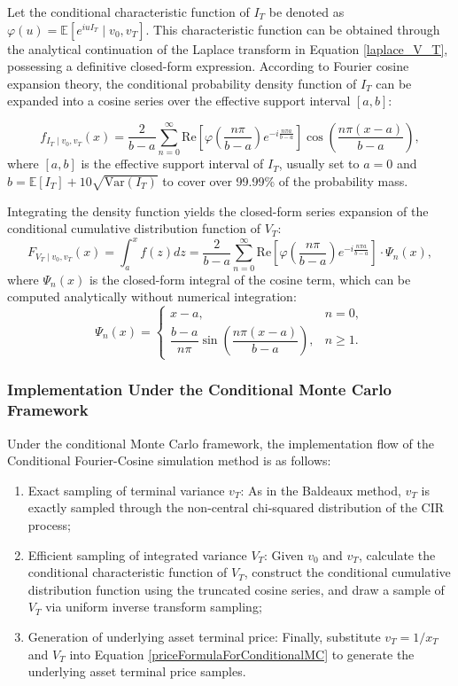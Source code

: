 Let the conditional characteristic function of $I_T$ be denoted as $\varphi(u) = \mathbb{E}\left[ e^{iuI_T} \mid v_0, v_T \right]$. This characteristic function can be obtained through the analytical continuation of the Laplace transform in Equation \eqref{laplace_V_T}, possessing a definitive closed-form expression. According to Fourier cosine expansion theory, the conditional probability density function of $I_T$ can be expanded into a cosine series over the effective support interval $[a,b]$:

\begin{equation}
  f_{I_T \mid v_0, v_T}(x) = \frac{2}{b-a} \sum_{n=0}^\infty \text{Re}\left[ \varphi\left( \frac{n\pi}{b-a} \right) e^{-i \frac{n\pi a}{b-a}} \right] \cos\left( \frac{n\pi (x-a)}{b-a} \right),
\end{equation}
where $[a,b]$ is the effective support interval of $I_T$, usually set to $a = 0$ and $b = \mathbb{E}[I_T] + 10\sqrt{\mathrm{Var}(I_T)}$ to cover over 99.99\% of the probability mass.

Integrating the density function yields the closed-form series expansion of the conditional cumulative distribution function of $V_T$:
\begin{equation}
  F_{V_T \mid v_0, v_T}(x) = \int_a^x f(z) dz = \frac{2}{b-a} \sum_{n=0}^\infty \text{Re}\left[ \varphi\left( \frac{n\pi}{b-a} \right) e^{-i \frac{n\pi a}{b-a}} \right] \cdot \Psi_n(x),
\end{equation}
where $\Psi_n(x)$ is the closed-form integral of the cosine term, which can be computed analytically without numerical integration:
\begin{equation}
\Psi_n(x) =
\begin{cases} 
x - a, & n = 0, \\
\dfrac{b-a}{n\pi} \sin\left( \dfrac{n\pi (x-a)}{b-a} \right), & n \geq 1.
\end{cases}
\end{equation}

\subsubsection{Implementation Under the Conditional Monte Carlo Framework}
Under the conditional Monte Carlo framework, the implementation flow of the Conditional Fourier-Cosine simulation method is as follows:
\begin{enumerate}
  \item Exact sampling of terminal variance $v_T$: As in the Baldeaux method, $v_T$ is exactly sampled through the non-central chi-squared distribution of the CIR process;
  \item Efficient sampling of integrated variance $V_T$: Given $v_0$ and $v_T$, calculate the conditional characteristic function of $V_T$, construct the conditional cumulative distribution function using the truncated cosine series, and draw a sample of $V_T$ via uniform inverse transform sampling;
  \item Generation of underlying asset terminal price: Finally, substitute $v_T=1/x_T$ and $V_T$ into Equation \eqref{priceFormulaForConditionalMC} to generate the underlying asset terminal price samples.
\end{enumerate}

